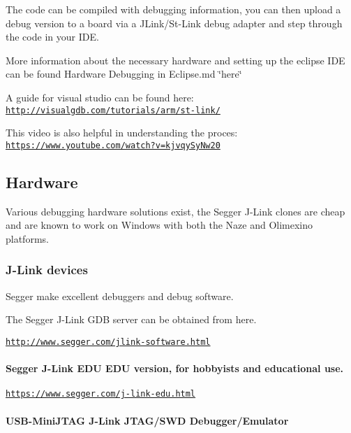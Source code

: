 The code can be compiled with debugging information, you can then upload a debug version to a board via a J\+Link/\+St-\/\+Link debug adapter and step through the code in your I\+D\+E.

More information about the necessary hardware and setting up the eclipse I\+D\+E can be found Hardware Debugging in Eclipse.\+md \char`\"{}here\char`\"{}

A guide for visual studio can be found here\+: \href{http://visualgdb.com/tutorials/arm/st-link/}{\tt http\+://visualgdb.\+com/tutorials/arm/st-\/link/}

This video is also helpful in understanding the proces\+: \href{https://www.youtube.com/watch?v=kjvqySyNw20}{\tt https\+://www.\+youtube.\+com/watch?v=kjvqy\+Sy\+Nw20}

\subsection*{Hardware}

Various debugging hardware solutions exist, the Segger J-\/\+Link clones are cheap and are known to work on Windows with both the Naze and Olimexino platforms.

\subsubsection*{J-\/\+Link devices}

Segger make excellent debuggers and debug software.

The Segger J-\/\+Link G\+D\+B server can be obtained from here.

\href{http://www.segger.com/jlink-software.html}{\tt http\+://www.\+segger.\+com/jlink-\/software.\+html}

\paragraph*{Segger J-\/\+Link E\+D\+U E\+D\+U version, for hobbyists and educational use.}



\href{https://www.segger.com/j-link-edu.html}{\tt https\+://www.\+segger.\+com/j-\/link-\/edu.\+html}

\paragraph*{U\+S\+B-\/\+Mini\+J\+T\+A\+G J-\/\+Link J\+T\+A\+G/\+S\+W\+D Debugger/\+Emulator}

